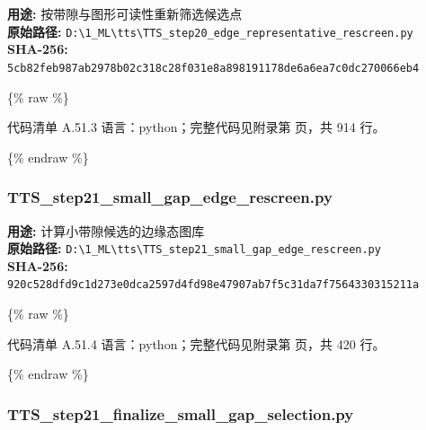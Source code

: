 \documentclass[lang=cn,scheme=chinese,color=blue,device=normal,toc=onecol,math=cm]{elegantbook}
\begin{document}
\textbf{用途:} 按带隙与图形可读性重新筛选候选点\\ \textbf{原始路径:} \texttt{D:\textbackslash{}\allowbreak{}1\_\allowbreak{}ML\textbackslash{}\allowbreak{}tts\textbackslash{}\allowbreak{}TTS\_\allowbreak{}step20\_\allowbreak{}edge\_\allowbreak{}representative\_\allowbreak{}rescreen.py}\\ \textbf{SHA-256:} \texttt{5cb82feb987ab2978b02c318c28f031e8a898191178de6a6ea7c0dc270066eb4}\par


\{\% raw \%\}\par


\begin{codeindexbox}{代码清单 A.51.3}
语言：python；完整代码见附录第 \pageref{code:51:3} 页，共 914 行。
\end{codeindexbox}


\{\% endraw \%\}\par


\subsubsection{TTS\_\allowbreak{}step21\_\allowbreak{}small\_\allowbreak{}gap\_\allowbreak{}edge\_\allowbreak{}rescreen.py}


\textbf{用途:} 计算小带隙候选的边缘态图库\\ \textbf{原始路径:} \texttt{D:\textbackslash{}\allowbreak{}1\_\allowbreak{}ML\textbackslash{}\allowbreak{}tts\textbackslash{}\allowbreak{}TTS\_\allowbreak{}step21\_\allowbreak{}small\_\allowbreak{}gap\_\allowbreak{}edge\_\allowbreak{}rescreen.py}\\ \textbf{SHA-256:} \texttt{920c528dfd9c1d273e0dca2597d4fd98e47907ab7f5c31da7f7564330315211a}\par


\{\% raw \%\}\par


\begin{codeindexbox}{代码清单 A.51.4}
语言：python；完整代码见附录第 \pageref{code:51:4} 页，共 420 行。
\end{codeindexbox}


\{\% endraw \%\}\par


\subsubsection{TTS\_\allowbreak{}step21\_\allowbreak{}finalize\_\allowbreak{}small\_\allowbreak{}gap\_\allowbreak{}selection.py}
\end{document}
